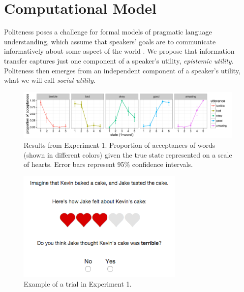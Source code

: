 \documentclass[10pt,letterpaper]{article}
\begin{document}

\section{Computational Model}

Politeness poses a challenge for formal models of pragmatic language understanding, which assume that speakers' goals are to communicate informatively about some aspect of the world \cite{Frank2012, Goodman2013}.
We propose that information transfer captures just one component of a speaker's utility, \emph{epistemic utility}.
Politeness then emerges from an independent component of a speaker's utility, what we will call \emph{social utility}.



\begin{figure}[!b]
\begin{center}
  \includegraphics[width=.9\textwidth]{figures/exp1.pdf}
  \caption{\label{fig:exp1} Results from Experiment 1. Proportion of acceptances of words (shown in different colors) given the true state represented on a scale of hearts. Error bars represent 95\% confidence intervals.}
  \end{center}
\end{figure}

\begin{figure}[t]
\begin{centering}
\includegraphics[width=3.2in]{figures/example.png}
\caption{\label{fig:ex} Example of a trial in Experiment 1.}
\end{centering}
\end{figure}
\end{document}
